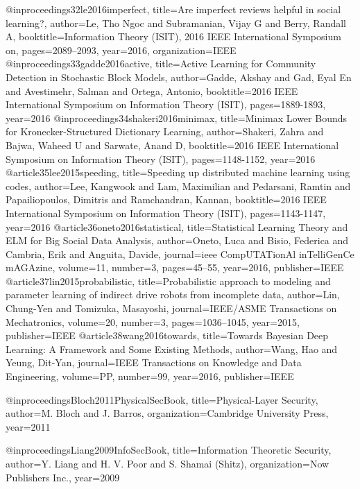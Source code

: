 {{{{@inproceedings{32le2016imperfect,
	title={Are imperfect reviews helpful in social learning?},
	author={Le, Tho Ngoc and Subramanian, Vijay G and Berry, Randall A},
	booktitle={Information Theory (ISIT), 2016 IEEE International Symposium on},
	pages={2089--2093},
	year={2016},
	organization={IEEE}
}
@inproceedings{33gadde2016active,
	title={Active Learning for Community Detection in Stochastic Block Models},
	author={Gadde, Akshay and Gad, Eyal En and Avestimehr, Salman and Ortega, Antonio},
	booktitle={2016 IEEE International Symposium on Information Theory (ISIT)},
	pages={1889-1893},
	year={2016}
}
@inproceedings{34shakeri2016minimax,
	title={Minimax Lower Bounds for Kronecker-Structured Dictionary Learning},
	author={Shakeri, Zahra and Bajwa, Waheed U and Sarwate, Anand D},
	booktitle={2016 IEEE International Symposium on Information Theory (ISIT)},
	pages={1148-1152},
	year={2016}
}
@article{35lee2015speeding,
	title={Speeding up distributed machine learning using codes},
	author={Lee, Kangwook and Lam, Maximilian and Pedarsani, Ramtin and Papailiopoulos, Dimitris and Ramchandran, Kannan},
	booktitle={2016 IEEE International Symposium on Information Theory (ISIT)},
	pages={1143-1147},
	year={2016}
}
@article{36oneto2016statistical,
	title={Statistical Learning Theory and ELM for Big Social Data Analysis},
	author={Oneto, Luca and Bisio, Federica and Cambria, Erik and Anguita, Davide},
	journal={ieee CompUTATionAl inTelliGenCe mAGAzine},
	volume={11},
	number={3},
	pages={45--55},
	year={2016},
	publisher={IEEE}
}
@article{37lin2015probabilistic,
	title={Probabilistic approach to modeling and parameter learning of indirect drive robots from incomplete data},
	author={Lin, Chung-Yen and Tomizuka, Masayoshi},
	journal={IEEE/ASME Transactions on Mechatronics},
	volume={20},
	number={3},
	pages={1036--1045},
	year={2015},
	publisher={IEEE}
}
@article{38wang2016towards,
	title={Towards Bayesian Deep Learning: A Framework and Some Existing Methods},
	author={Wang, Hao and Yeung, Dit-Yan},
	journal={IEEE Transactions on Knowledge and Data Engineering},
	volume={PP},
	number={99},
	year={2016},
	publisher={IEEE}
}






@inproceedings{Bloch2011PhysicalSecBook,
	title={Physical-Layer Security},
	author={M. Bloch and J. Barros},
	organization={Cambridge University Press},
	year={2011}
}



@inproceedings{Liang2009InfoSecBook,
	title={Information Theoretic Security},
	author={Y. Liang and H. V. Poor and S. Shamai (Shitz)},
	organization={Now Publishers Inc.},
	year={2009}
}


}}}}
